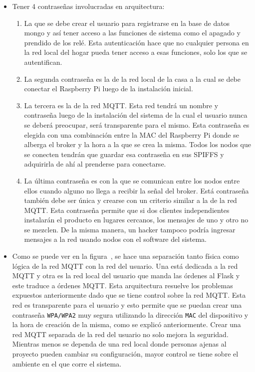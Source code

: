 \begin{itemize}

\item Tener 4 contraseñas involucradas en arquitectura: 
	
	\begin{enumerate}
	\item La que se debe crear el usuario para registrarse en la base de datos mongo y así tener acceso a las funciones de sistema como el apagado y prendido de los relé. Esta autenticación hace que no cualquier persona en la red local del hogar pueda tener acceso a esas funciones, solo los que se autentifican. 

	\item La segunda contraseña es la de la red local de la casa a la cual se debe conectar el Raspberry Pi luego de la instalación inicial.

	\item La tercera es la de la red MQTT. Esta red tendrá un nombre y contraseña luego de la instalación del sistema de la cual el usuario nunca se deberá preocupar, será transparente para el mismo. Esta contraseña es elegida con una combinación entre la MAC del Raspberry Pi donde se alberga el broker y la hora a la que se crea la misma. Todos los nodos que se conecten tendrán que guardar esa contraseña en sus SPIFFS y adquirirla de ahí al prenderse para conectarse.

	\item La última contraseña es con la que se comunican entre los nodos entre ellos cuando alguno no llega a recibir la señal del broker. Está contraseña también debe ser única y crearse con un criterio similar a la de la red MQTT. Esta contraseña permite que si dos clientes independientes instalarán el producto en lugares cercanos, los mensajes de uno y otro no se mezclen. De la misma manera, un hacker tampoco podría ingresar mensajes a la red usando nodos con el software del sistema.

\end{enumerate}

\item Como se puede ver en la figura~, se hace una separación tanto física como lógica de la red MQTT con la red del usuario. Una está dedicada a la red MQTT y otra es la red local del usuario que manda las órdenes al Flask y este traduce a órdenes MQTT. Esta arquitectura resuelve los problemas expuestos anteriormente dado que se tiene control sobre la red MQTT. Esta red es transparente para el usuario y esto permite que se puedan crear una contraseña \lstinline[columns=fixed]{WPA/WPA2} muy segura utilizando la dirección \lstinline[columns=fixed]{MAC} del dispositivo y la hora de creación de la misma, como se explicó anteriormente.
Crear una red MQTT separada de la red del usuario no solo mejora la seguridad. Mientras menos se dependa de una red local donde personas ajenas al proyecto pueden cambiar su configuración, mayor control se tiene sobre el ambiente en el que corre el sistema. 


\end{itemize}
